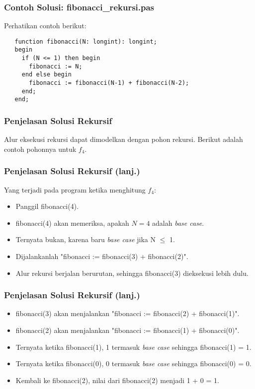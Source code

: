 \begin{frame}[fragile]
\frametitle{Contoh Solusi: fibonacci\_rekursi.pas}
Perhatikan contoh berikut:
\begin{lstlisting}
   function fibonacci(N: longint): longint;
   begin
     if (N <= 1) then begin
       fibonacci := N;
     end else begin
       fibonacci := fibonacci(N-1) + fibonacci(N-2);
     end;
   end;
\end{lstlisting}
\end{frame}

\begin{frame}[fragile]
\frametitle{Penjelasan Solusi Rekursif}
Alur eksekusi rekursi dapat dimodelkan dengan pohon rekursi. Berikut adalah contoh pohonnya untuk $f_4$.
\end{frame}

\begin{frame}
\frametitle{Penjelasan Solusi Rekursif (lanj.)}
Yang terjadi pada program ketika menghitung $f_4$:
\begin {itemize}
  \item Panggil fibonacci(4).
  \item fibonacci(4) akan memeriksa, apakah $N=4$ adalah \textit{base case}.
  \item Ternyata bukan, karena baru \textit{base case} jika N $\le$ 1.
  \item Dijalankanlah "fibonacci := fibonacci(3) + fibonacci(2)".
  \item Alur rekursi berjalan berurutan, sehingga fibonacci(3) dieksekusi lebih dulu.
\end{itemize}
\end{frame}

\begin{frame}
\frametitle{Penjelasan Solusi Rekursif (lanj.)}
\begin{itemize}
  \item fibonacci(3) akan menjalankan "fibonacci := fibonacci(2) + fibonacci(1)".
  \item fibonacci(2) akan menjalankan "fibonacci := fibonacci(1) + fibonacci(0)".
  \item Ternyata ketika fibonacci(1), 1 termasuk \textit{base case} sehingga fibonacci(1) = 1.
  \item Ternyata ketika fibonacci(0), 0 termasuk \textit{base case} sehingga fibonacci(0) = 0.
  \item Kembali ke fibonacci(2), nilai dari fibonacci(2) menjadi 1 + 0 = 1.
\end{itemize}
\end{frame}

